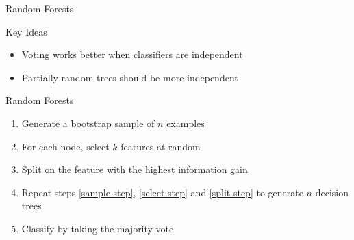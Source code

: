 \documentclass[14pt]{beamer}
\begin{document}
\begin{frame}[<+->]{Random Forests}
\begin{block}{Key Ideas}
\begin{itemize}
\item Voting works better when classifiers are independent
\item Partially random trees should be more independent
\end{itemize}
\end{block}
\begin{block}{Random Forests}
\begin{enumerate}
\item\label{sample-step} Generate a bootstrap sample of $n$ examples
\item\label{select-step} For each node, select $k$ features at random
\item\label{split-step} Split on the feature with the highest information gain
\item Repeat steps \ref{sample-step}, \ref{select-step} and \ref{split-step} to generate $n$ decision trees
\item Classify by taking the majority vote
\end{enumerate}
\end{block}
\end{frame}
\end{document}

